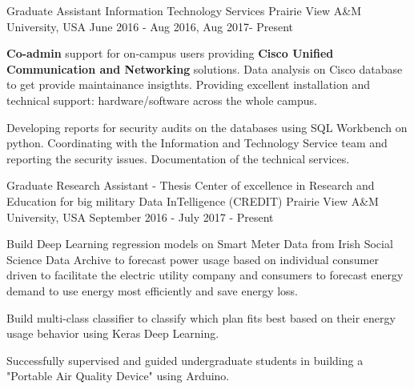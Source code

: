 \begin{cventries}
	\cventry
	{Graduate Assistant} %
	{Information Technology Services} %
	{Prairie View A\&M University, USA} %
	{June 2016 - Aug 2016, Aug 2017- Present} %
	{ %
		\begin{cvitems}
			\item { \textbf{Co-admin} support for on-campus users providing \textbf{Cisco Unified Communication and Networking} solutions. Data analysis on Cisco  database to get provide maintainance insigthts. Providing excellent installation and technical support: hardware/software across the whole campus.}  
			\item {Developing reports for security audits on the databases using SQL Workbench on python. Coordinating with the Information and Technology Service team and reporting the security issues. Documentation of the technical services.}
		\end{cvitems}
	}
\end{cventries}
\begin{cventries}
	\cventry
	{Graduate Research Assistant - Thesis} %
	{Center of excellence in Research and Education for big military Data InTelligence (CREDIT)} %
	{Prairie View A\&M University, USA} %
	{September 2016 - July 2017 - Present} %
	{ %
		\begin{cvitems}
			\item {Build Deep Learning regression models on Smart Meter Data from Irish Social Science Data Archive to forecast power usage based on individual consumer driven to facilitate the electric utility company and consumers to forecast energy demand to use energy most efficiently and save energy loss.}
			\item {Build multi-class classifier to classify which plan fits best based on their energy usage behavior using Keras Deep Learning.}
			\item {Successfully supervised and guided undergraduate students in building a "Portable Air Quality Device" using Arduino.}
		\end{cvitems}
	}
\end{cventries}

